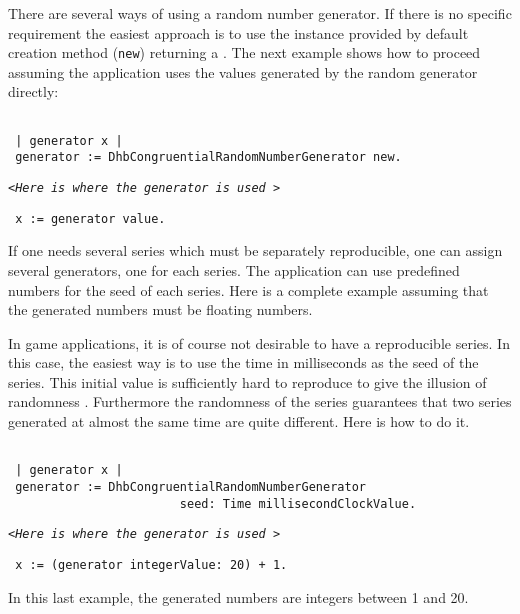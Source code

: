 \documentclass[twoside]{book}
\begin{document}
There are several ways of using a random number generator. If
there is no specific requirement the easiest approach is to use
the instance provided by default creation method ({\tt new})
returning a . The next example shows how to
proceed assuming the application uses the values generated by the
random generator directly:
\begin{codeExample}
\label{codex:crgdefault}
\begin{verbatim}

 | generator x |
 generator := DhbCongruentialRandomNumberGenerator new.
\end{verbatim}
\hfil{\tt <\sl Here is where the generator is used\tt
>}\hfil
\begin{verbatim}
 x := generator value.
\end{verbatim}
\end{codeExample}
If one needs several series which must be separately reproducible,
one can assign several generators, one for each series. The
application can use predefined numbers for the seed of each
series. Here is a complete example assuming that the generated
numbers must be floating numbers.

In game applications, it is of course not desirable to have a
reproducible series. In this case, the easiest way is to use the
time in milliseconds as the seed of the series. This initial value
is sufficiently hard to reproduce to give the illusion of
randomness . Furthermore the randomness of the series guarantees
that two series generated at almost the same time are quite
different. Here is how to do it.
\begin{codeExample}
\begin{verbatim}

 | generator x |
 generator := DhbCongruentialRandomNumberGenerator
                        seed: Time millisecondClockValue.
\end{verbatim}
\hfil{\tt <\sl Here is where the generator is used\tt
>}\hfil
\begin{verbatim}
 x := (generator integerValue: 20) + 1.
\end{verbatim}
\end{codeExample}
In this last example, the generated numbers are integers between 1
and 20.
\end{document}

